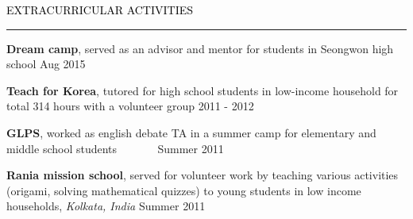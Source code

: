 \documentclass{resume} %
\renewenvironment{rSection}[1]{
	\sectionskip
	\textcolor{Black}{\MakeUppercase{#1}}
	\sectionlineskip
	\hrule
	\begin{list}{}{
			\setlength{\leftmargin}{1.5em}
		}
		\item[]
	}{
	\end{list}
}
\begin{document}
\begin{rSection}{Extracurricular activities}
	\vspace{-1mm}	
	\begin{rSubsection}{}{}{}{}
		\vspace*{-1.5mm}
		\item \textbf{Dream camp}, served as an advisor and mentor for students in Seongwon high school \hfill Aug 2015
		
		\item \textbf{Teach for Korea}, tutored for high school students in low-income household for total 314 hours with a volunteer group \hfill 2011 - 2012
		
		\item \textbf{GLPS}, worked as english debate TA in a summer camp for elementary and middle school students {~~~}{~~~} \null\hfill Summer 2011
		
		\item \textbf{Rania mission school}, served for volunteer work by teaching various activities (origami, solving mathematical quizzes) to young students in low income households, \textit{Kolkata, India} \hfill Summer 2011
		
	\end{rSubsection}
	
\end{rSection}
\vspace{-3mm}
	
	
\end{document}
